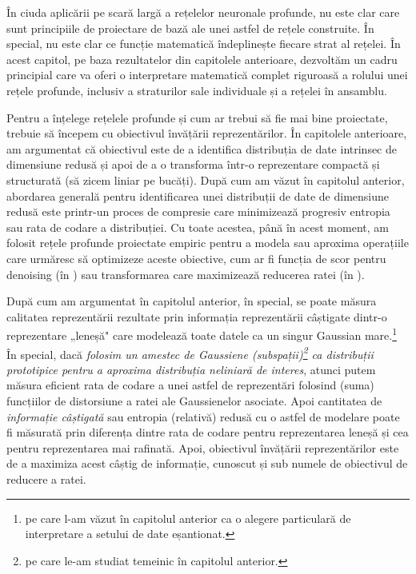 \documentclass[../../book-main_ro.tex]{subfiles}
\begin{document}
În ciuda aplicării pe scară largă a rețelelor neuronale profunde, nu este clar care sunt principiile de proiectare de bază ale unei astfel de rețele construite. În special, nu este clar ce funcție matematică îndeplinește fiecare strat al rețelei. În acest capitol, pe baza rezultatelor din capitolele anterioare, dezvoltăm un cadru principial care va oferi o interpretare matematică complet riguroasă a rolului unei rețele profunde, inclusiv a straturilor sale individuale și a rețelei în ansamblu. 

Pentru a înțelege rețelele profunde și cum ar trebui să fie mai bine proiectate, trebuie să începem cu obiectivul învățării reprezentărilor. În capitolele anterioare, am argumentat că obiectivul este de a identifica distribuția de date intrinsec de dimensiune redusă și apoi de a o transforma într-o reprezentare compactă și structurată (să zicem liniar pe bucăți). După cum am văzut în capitolul anterior, abordarea generală pentru identificarea unei distribuții de date de dimensiune redusă este printr-un proces de compresie care minimizează progresiv entropia sau rata de codare a distribuției. Cu toate acestea, până în acest moment, am folosit rețele profunde proiectate empiric pentru a modela sau aproxima operațiile care urmăresc să optimizeze aceste obiective, cum ar fi funcția de scor pentru denoising (în ) sau transformarea care maximizează reducerea ratei (în ). 

După cum am argumentat în capitolul anterior,  în special, se poate măsura calitatea reprezentării rezultate prin informația reprezentării câștigate dintr-o reprezentare „leneșă" care modelează toate datele ca un singur Gaussian mare.\footnote{pe care l-am văzut în capitolul anterior ca o alegere particulară de interpretare a setului de date eșantionat.} În special, dacă \textit{folosim un amestec de Gaussiene (subspații)\footnote{pe care le-am studiat temeinic în capitolul anterior.} ca distribuții prototipice pentru a aproxima distribuția neliniară de interes}, atunci putem măsura eficient rata de codare a unei astfel de reprezentări folosind (suma) funcțiilor de distorsiune a ratei ale Gaussienelor asociate. Apoi cantitatea de {\em informație câștigată} sau entropia (relativă) redusă cu o astfel de modelare poate fi măsurată prin diferența dintre rata de codare pentru reprezentarea leneșă și cea pentru reprezentarea mai rafinată. Apoi, obiectivul învățării reprezentărilor este de a maximiza acest câștig de informație, cunoscut și sub numele de obiectivul de reducere a ratei. 
\end{document}
